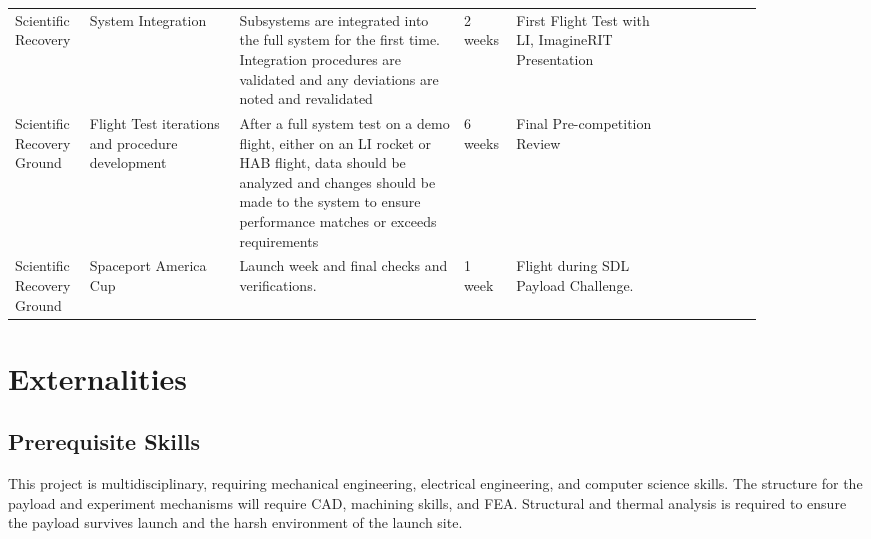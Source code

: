 \documentclass[conference]{IEEEtran} %
\begin{document}
\begin{table*}[b]
\begin{tabular}{p{0.1\linewidth} p{0.2\linewidth} p{0.3\linewidth} p{0.07\linewidth} p{0.2\linewidth} l}
    		\addlinespace[.25cm]
    		Scientific Recovery        & System Integration                               & Subsystems are integrated into the full system for the first time. Integration procedures are validated and any deviations are noted and revalidated                                                                                                                                                                      & 2 weeks       & First Flight Test with LI, ImagineRIT Presentation \\
    		\addlinespace[.25cm]
    		Scientific Recovery Ground & Flight Test iterations and procedure development & After a full system test on a demo flight, either on an LI rocket or HAB flight, data should be analyzed and changes should be made to the system to ensure performance matches or exceeds requirements                                                                                                                   & 6 weeks       & Final Pre-competition Review                       \\
    		\addlinespace[.25cm]
    		Scientific Recovery Ground & Spaceport America Cup                            & Launch week and final checks and verifications.                                                                                                                                                                                                                                                                           & 1 week        & Flight during SDL Payload Challenge. \\
    		\bottomrule
    		\end{tabular}
\label{tab:milestone}
\end{table*}

\section{Externalities}
\subsection{Prerequisite Skills}
This project is multidisciplinary, requiring mechanical engineering, electrical engineering, and computer science skills. The structure for the payload and experiment mechanisms will require CAD, machining skills, and FEA. Structural and thermal analysis is required to ensure the payload survives launch and the harsh environment of the launch site.
\end{document}
